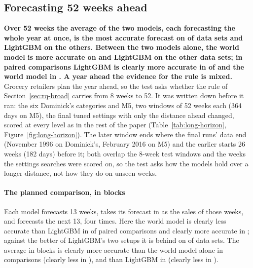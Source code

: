 \subsection{Forecasting 52 weeks ahead}
\label{sec:long-horizon}

\textbf{Over 52 weeks the average of the two models, each forecasting the whole year
at once, is the most accurate forecast on \lhLowestAvgDirect{} of \lhSets{} data sets and
LightGBM on the others. Between the two models alone, the world model is more accurate on
\lhWmDirAheadNames{} and LightGBM on the other data sets; in paired comparisons
LightGBM is clearly more accurate in \lhPWmDirWorse{} of \lhPWmDirN{} and the world model in
\lhPWmDirBetter{}. A year ahead the evidence for the rule is mixed.} Grocery retailers plan the year ahead, so the test asks
whether the rule of Section~\ref{sec:rq-broad} carries from 8 weeks to 52. It
was written down before it ran: the six Dominick's categories and M5, two
windows of 52 weeks each (364 days on M5), the final tuned settings with only the
distance ahead changed, scored at every level as in the rest of the paper
(Table~\ref{tab:long-horizon}, Figure~\ref{fig:long-horizon}). The later window
ends where the final runs' data end (November 1996 on Dominick's, February 2016
on M5) and the earlier starts 26 weeks (182 days) before it; both overlap the
8-week test windows and the weeks the settings searches were scored on, so the
test asks how the models hold over a longer distance, not how they do on unseen
weeks.

\paragraph{The planned comparison, in blocks}
Each model forecasts 13 weeks, takes its forecast in as the sales of those weeks,
and forecasts the next 13, four times. Here the world model is clearly less
accurate than LightGBM in \lhPWmWorse{} of \lhPN{} paired comparisons and clearly
more accurate in \lhPWmBetter{}; against the better of LightGBM's two setups it
is behind on \lhLgbBestBeatsWm{} of \lhSets{} data sets. The average in blocks is
clearly more accurate than the world model alone in \lhPAvgWmBetter{} comparisons
(clearly less in \lhPAvgWmWorse{}), and than LightGBM in \lhPAvgLgbBetter{}
(clearly less in \lhPAvgLgbWorse{}).

